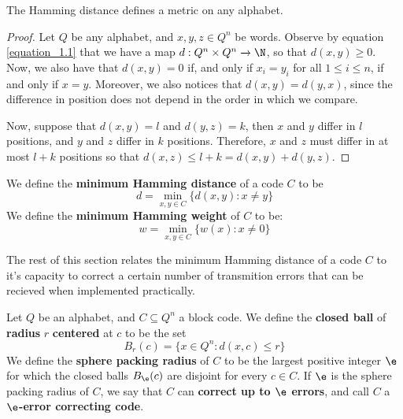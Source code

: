 \begin{lemma}\label{lemma_1.1.1}
  The Hamming distance defines a metric on any alphabet.
\end{lemma}
\begin{proof}
  Let $Q$ be any alphabet, and  $x,y,z \in Q^n$ be words. Observe by equation
  \ref{equation_1.1} that we have a map $d:Q^n \times Q^n \xrightarrow{} \N$, so
  that $d(x,y) \geq 0$. Now, we also have that $d(x,y)=0$ if, and only if
  $x_i=y_i$ for all  $1 \leq i \leq n$, if and only if $x=y$. Moreover, we also
  notices that  $d(x,y)=d(y,x)$, since the difference in position does not
  depend in the order in which we compare.

  Now, suppose that $d(x,y)=l$ and $d(y,z)=k$, then $x$ and  $y$ differ in  $l$
  positions, and  $y$ and $z$ differ in $k$ positions. Therefore, $x$ and $z$
  must differ in at most  $l+k$ positions so that  $d(x,z) \leq
  l+k=d(x,y)+d(y,z)$.
\end{proof}

\begin{definition}
  We define the \textbf{minimum Hamming distance} of a code $C$ to be
  \begin{equation}\label{equation_1.3}
    d=\min_{x,y \in C}{\{d(x,y) : x \neq y\}}
  \end{equation}
  We define the \textbf{minimum Hamming weight} of $C$ to be:
  \begin{equation}\label{equation_1.4}
    w=\min_{x,y \in C}{\{w(x) : x \neq 0\}}
  \end{equation}
\end{definition}

The rest of this section relates the minimum Hamming distance of a code $C$ to
it's capacity to correct a certain number of transmition errors that can be
recieved when implemented practically.

\begin{definition}
  Let $Q$ be an alphabet, and $C \subseteq Q^n$ a block code. We define the
  \textbf{closed ball} of \textbf{radius} $r$  \textbf{centered} at $c$ to be
  the set
  \begin{equation*}
    B_r(c)=\{ x \in Q^n : d(x,c) \leq r \}
  \end{equation*}
  We define the \textbf{sphere packing radius} of $C$ to be the largest positive
  integer $\e$ for which the closed balls  $B_\e(c)$ are disjoint for every $c
  \in C$. If $\e$ is the sphere packing radius of $C$, we say that $C$ can
  \textbf{correct up to $\e$ errors}, and call $C$ a  \textbf{$\e$-error
  correcting code}.
\end{definition}


